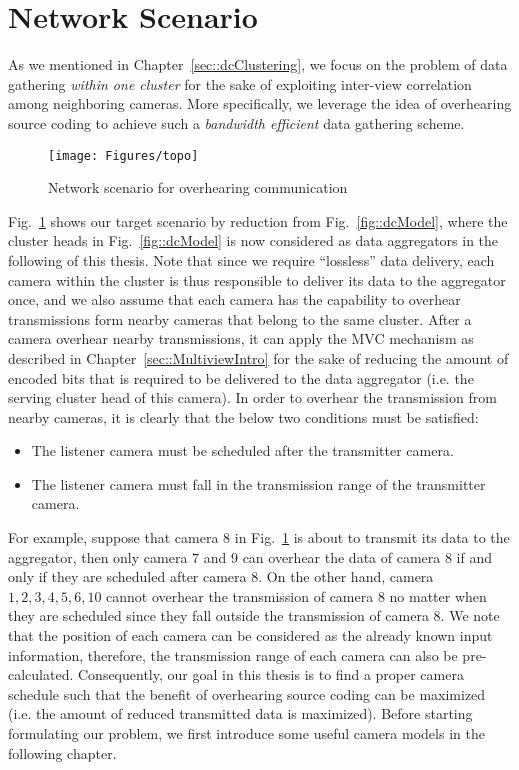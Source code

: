 \section{Network Scenario}
\label{sec::networkScenario}
%
As we mentioned in Chapter~\ref{sec::dcClustering}, we focus on the problem of data gathering \emph{within one cluster} for the sake of exploiting inter-view correlation among neighboring cameras.
More specifically, we leverage the idea of overhearing source coding to achieve such a \emph{bandwidth efficient} data gathering scheme.
%
\begin{figure}
\centering
\texttt{[image: Figures/topo]}
\caption{\label{fig::sysModel}Network scenario for overhearing communication}
\end{figure}
%
Fig.~\ref{fig::sysModel} shows our target scenario by reduction from Fig.~\ref{fig::dcModel}, where the cluster heads in Fig.~\ref{fig::dcModel} is now considered as data aggregators in the following of this thesis.
Note that since we require ``lossless'' data delivery, each camera within the cluster is thus responsible to deliver its data to the aggregator once, and we also assume that each camera has the capability to overhear transmissions form nearby cameras that belong to the same cluster.
After a camera overhear nearby transmissions, it can apply the MVC mechanism as described in Chapter~\ref{sec::MultiviewIntro} for the sake of reducing the amount of encoded bits that is required to be delivered to the data aggregator (i.e. the serving cluster head of this camera).
In order to overhear the transmission from nearby cameras, it is clearly that the below two conditions must be satisfied:
\begin{itemize}
\item The listener camera must be scheduled after the transmitter camera.
\item The listener camera must fall in the transmission range of the transmitter camera.
\end{itemize}
For example, suppose that camera $8$ in Fig.~\ref{fig::sysModel} is about to transmit its data to the aggregator, then only camera $7$ and $9$ can overhear the data of camera $8$ if and only if they are scheduled after camera $8$.
On the other hand, camera ${1,2,3,4,5,6,10}$ cannot overhear the transmission of camera $8$ no matter when they are scheduled since they fall outside the transmission of camera $8$.
We note that the position of each camera can be considered as the already known input information, therefore, the transmission range of each camera can also be pre-calculated.
Consequently, our goal in this thesis is to find a proper camera schedule such that the benefit of overhearing source coding can be maximized (i.e. the amount of reduced transmitted data is maximized).
Before starting formulating our problem, we first introduce some useful camera models in the following chapter.
